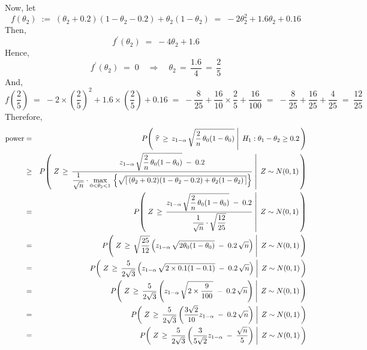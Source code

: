 Now, let
\begin{equation*}
f(\theta_{2})
\; := \; (\theta_{2}+0.2)(1-\theta_{2}-0.2) + \theta_{2}(1-\theta_{2})
\; = \; -2\theta_{2}^{2} + 1.6\theta_{2} + 0.16
\end{equation*}
Then,
\begin{equation*}
f^{\prime}(\theta_{2})
\; = \; -4\theta_{2} + 1.6
\end{equation*}
Hence,
\begin{equation*}
f^{\prime}(\theta_{2}) \;=\; 0
\quad\Longrightarrow\quad
\theta_{2} \,=\, \dfrac{1.6}{4} \,=\, \dfrac{2}{5}
\end{equation*}
And,
\begin{equation*}
f\!\left(\dfrac{2}{5}\right)
\; = \; -2\times\left(\dfrac{2}{5}\right)^{2} + 1.6\times\left(\dfrac{2}{5}\right) + 0.16
\; = \; -\dfrac{8}{25} + \dfrac{16}{10}\times\dfrac{2}{5} + \dfrac{16}{100}
\; = \; -\dfrac{8}{25} + \dfrac{16}{25} + \dfrac{4}{25}
\; = \; \dfrac{12}{25}
\end{equation*}
Therefore,
\begin{eqnarray*}
\textnormal{power}
&=& P\!\left(\,\left.\widehat{\tau}\,\geq\,z_{1-\alpha}\,\sqrt{\dfrac{2}{n}\,\theta_{0}(1-\theta_{0})}\;\right\vert\;H_{1}:\theta_{1} - \theta_{2} \geq 0.2\,\right)
\\
&\geq& P\!\left(\,
\left.
Z
\,\geq\,
\dfrac{z_{1-\alpha}\,\sqrt{\dfrac{2}{n}\,\theta_{0}(1-\theta_{0})}\;-\;0.2}
{\dfrac{1}{\sqrt{n}}\cdot\underset{0<\theta_{2}<1}{\max}\,\left\{\sqrt{\left[\,(\theta_{2}+0.2)(1-\theta_{2}-0.2) + \theta_{2}(1-\theta_{2})\,\right]}\right\}}\;
\right\vert\;
Z \sim N(0,1)
\,\right)
\\
&=& P\!\left(\,
\left.
Z
\,\geq\,
\dfrac{z_{1-\alpha}\,\sqrt{\dfrac{2}{n}\,\theta_{0}(1-\theta_{0})}\;-\;0.2}
{\dfrac{1}{\sqrt{n}}\cdot\sqrt{\dfrac{12}{25}}}\;
\right\vert\;
Z \sim N(0,1)
\,\right)
\\
&=& P\!\left(\,
\left.
Z
\,\geq\,
\sqrt{\dfrac{25}{12}}\left(z_{1-\alpha}\,\sqrt{2\theta_{0}(1-\theta_{0})}\;-\;0.2\,\sqrt{n}\right)\;
\right\vert\;
Z \sim N(0,1)
\,\right)
\\
&=& P\!\left(\,
\left.
Z
\,\geq\,
\dfrac{5}{2\sqrt{3}}\left(z_{1-\alpha}\,\sqrt{2\times0.1(1-0.1)}\;-\;0.2\,\sqrt{n}\right)\;
\right\vert\;
Z \sim N(0,1)
\,\right)
\\
&=& P\!\left(\,
\left.
Z
\,\geq\,
\dfrac{5}{2\sqrt{3}}\left(z_{1-\alpha}\,\sqrt{2\times\dfrac{9}{100}}\;-\;0.2\,\sqrt{n}\right)\;
\right\vert\;
Z \sim N(0,1)
\,\right)
\\
&=& P\!\left(\,
\left.
Z
\,\geq\,
\dfrac{5}{2\sqrt{3}}\left(\dfrac{3\sqrt{2}}{10}z_{1-\alpha}\;-\;0.2\,\sqrt{n}\right)\;
\right\vert\;
Z \sim N(0,1)
\,\right)
\\
&=& P\!\left(\,
\left.
Z
\,\geq\,
\dfrac{5}{2\sqrt{3}}\left(\dfrac{3}{5\sqrt{2}}z_{1-\alpha}\;-\;\dfrac{\sqrt{n}}{5}\right)\;
\right\vert\;
Z \sim N(0,1)
\,\right)
\end{eqnarray*}
